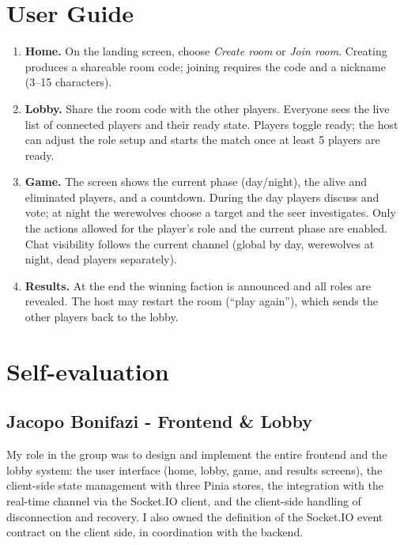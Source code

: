 \documentclass{scrartcl}
\begin{document}
\section{User Guide}\label{user-guide}

\begin{enumerate}
  \item \textbf{Home.} On the landing screen, choose \emph{Create room}
  or \emph{Join room}. Creating produces a shareable room code; joining
  requires the code and a nickname (3--15 characters).

  \item \textbf{Lobby.} Share the room code with the other players.
  Everyone sees the live list of connected players and their ready
  state. Players toggle ready; the host can adjust the role setup and
  starts the match once at least 5 players are ready.

  \item \textbf{Game.} The screen shows the current phase (day/night),
  the alive and eliminated players, and a countdown. During the day
  players discuss and vote; at night the werewolves choose a target and
  the seer investigates. Only the actions allowed for the player's role
  and the current phase are enabled. Chat visibility follows the current
  channel (global by day, werewolves at night, dead players separately).

  \item \textbf{Results.} At the end the winning faction is announced
  and all roles are revealed. The host may restart the room (``play
  again''), which sends the other players back to the lobby.
\end{enumerate}

\section{Self-evaluation}\label{self-evaluation}

\subsection{Jacopo Bonifazi - Frontend \& Lobby}

My role in the group was to design and implement the entire frontend and
the lobby system: the user interface (home, lobby, game, and results
screens), the client-side state management with three Pinia stores, the
integration with the real-time channel via the Socket.IO client, and the
client-side handling of disconnection and recovery. I also owned the
definition of the Socket.IO event contract on the client side, in
coordination with the backend.
\end{document}
